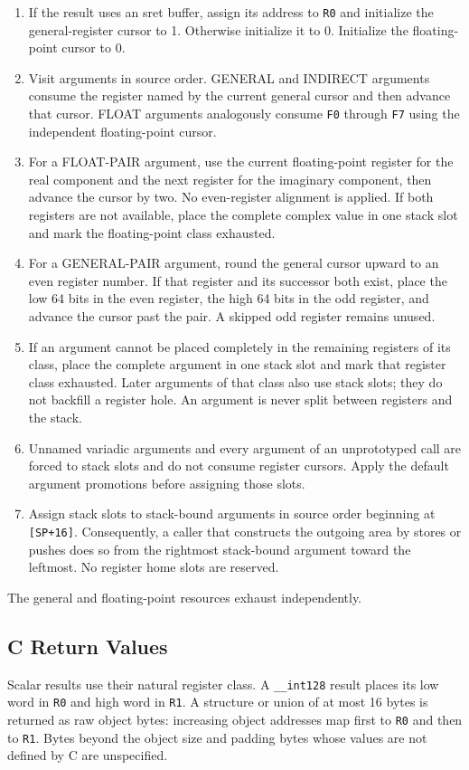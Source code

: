 \documentclass[10pt,twoside]{article}
\begin{document}
\begin{enumerate}[leftmargin=1.35em,itemsep=3pt,topsep=3pt]
\item If the result uses an sret buffer, assign its address to \texttt{R0} and
initialize the general-register cursor to 1. Otherwise initialize it to 0.
Initialize the floating-point cursor to 0.
\item Visit arguments in source order. GENERAL and INDIRECT arguments consume
the register named by the current general cursor and then advance that cursor.
FLOAT arguments analogously consume \texttt{F0} through \texttt{F7} using the
independent floating-point cursor.
\item For a FLOAT-PAIR argument, use the current floating-point register for
the real component and the next register for the imaginary component, then
advance the cursor by two. No even-register alignment is applied. If both
registers are not available, place the complete complex value in one stack
slot and mark the floating-point class exhausted.
\item For a GENERAL-PAIR argument, round the general cursor upward to an even
register number. If that register and its successor both exist, place the low
64 bits in the even register, the high 64 bits in the odd register, and advance
the cursor past the pair. A skipped odd register remains unused.
\item If an argument cannot be placed completely in the remaining
registers of its class, place the complete argument in one stack slot and mark
that register class exhausted. Later arguments of that class also use stack
slots; they do not backfill a register hole. An argument is never split between
registers and the stack.
\item Unnamed variadic arguments and every argument of an unprototyped call are
forced to stack slots and do not consume register cursors. Apply the default
argument promotions before assigning those slots.
\item Assign stack slots to stack-bound arguments in source order beginning at
\texttt{[SP+16]}. Consequently, a caller that constructs the outgoing area by
stores or pushes does so from the rightmost stack-bound argument toward the
leftmost. No register home slots are reserved.
\end{enumerate}

The general and floating-point resources exhaust independently.

\subsection{C Return Values}
Scalar results use their natural register class. A \texttt{\_\_int128} result
places its low word in \texttt{R0} and high word in \texttt{R1}. A structure
or union of at most 16 bytes is returned as raw object bytes: increasing object
addresses map first to \texttt{R0} and then to \texttt{R1}. Bytes beyond the
object size and padding bytes whose values are not defined by C are
unspecified.
\end{document}

